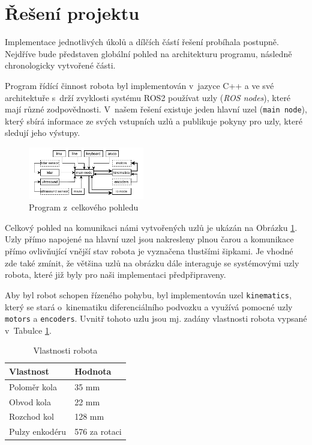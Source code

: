 \section{Řešení projektu}

Implementace jednotlivých úkolů a dílčích částí řešení probíhala postupně. Nejdříve bude představen globální pohled na architekturu programu, následně chronologicky vytvořené části.

Program řídící činnost robota byl implementován v~jazyce C++ a ve své architektuře s~drží zvyklosti systému ROS2 \cite{ros} používat uzly (\textit{ROS nodes}), které mají různé zodpovědnosti. V~našem řešení existuje jeden hlavní uzel (\texttt{main node}), který sbírá informace ze svých vstupních uzlů a publikuje pokyny pro uzly, které sledují jeho výstupy. 

\begin{figure}[h]
    \centering
    \includegraphics[width=0.45\textwidth]{images/nodes_schematic.png}
    \caption{Program z~celkového pohledu}
    \label{fig:program_obr}
\end{figure}

Celkový pohled na komunikaci námi vytvořených uzlů je ukázán na Obrázku \ref{fig:program_obr}. Uzly přímo napojené na hlavní uzel jsou nakresleny plnou čarou a komunikace přímo ovlivňující vnější stav robota je vyznačena tlustšími šipkami. Je vhodné zde také zmínit, že většina uzlů na obrázku dále interaguje se systémovými uzly robota, které již byly pro naši implementaci předpřipraveny.

Aby byl robot schopen řízeného pohybu, byl implementován uzel \texttt{kinematics}, který se stará o~kinematiku diferenciálního podvozku a využívá pomocné uzly \texttt{motors} a \texttt{encoders}. Uvnitř tohoto uzlu jsou mj. zadány vlastnosti robota vypsané v~Tabulce \ref{tab:vlastnosi}.

\begin{table}[]
    \centering
    \begin{tabular}{|l|l|}
        \hline
        \textbf{Vlastnost} & \textbf{Hodnota} \\ \hline
        Poloměr kola & 35 mm \\ \hline
        Obvod kola & 22 mm \\ \hline
        Rozchod kol & 128 mm \\ \hline
        Pulzy enkodéru & 576 za rotaci \\ \hline
    \end{tabular}
    \caption{Vlastnosti robota}
    \label{tab:vlastnosi}
\end{table}

